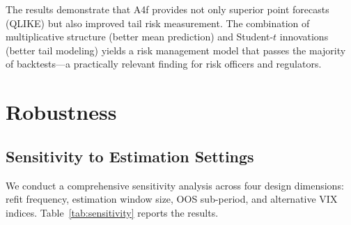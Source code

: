 \documentclass[12pt,a4paper]{article}
\begin{document}
The results demonstrate that A4f provides not only superior point forecasts (QLIKE) but also improved tail risk measurement. The combination of multiplicative structure (better mean prediction) and Student-$t$ innovations (better tail modeling) yields a risk management model that passes the majority of backtests---a practically relevant finding for risk officers and regulators.


\section{Robustness}
\label{sec:robustness}

\subsection{Sensitivity to Estimation Settings}

We conduct a comprehensive sensitivity analysis across four design dimensions: refit frequency, estimation window size, OOS sub-period, and alternative VIX indices. Table~\ref{tab:sensitivity} reports the results.
\end{document}
